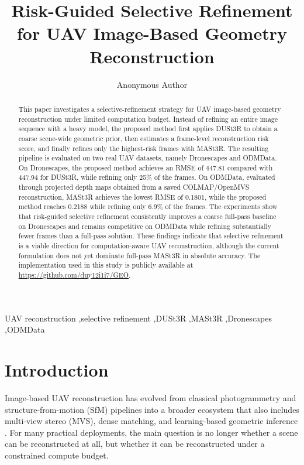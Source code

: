 \documentclass[preprint,12pt]{elsarticle}
\begin{document}
\begin{frontmatter}

\title{Risk-Guided Selective Refinement for UAV Image-Based Geometry Reconstruction}

\author{Anonymous Author}

\begin{abstract}
This paper investigates a selective-refinement strategy for UAV image-based geometry reconstruction under limited computation budget. Instead of refining an entire image sequence with a heavy model, the proposed method first applies DUSt3R to obtain a coarse scene-wide geometric prior, then estimates a frame-level reconstruction risk score, and finally refines only the highest-risk frames with MASt3R. The resulting pipeline is evaluated on two real UAV datasets, namely Dronescapes and ODMData. On Dronescapes, the proposed method achieves an RMSE of 447.81 compared with 447.94 for DUSt3R, while refining only 25\% of the frames. On ODMData, evaluated through projected depth maps obtained from a saved COLMAP/OpenMVS reconstruction, MASt3R achieves the lowest RMSE of 0.1801, while the proposed method reaches 0.2188 while refining only 6.9\% of the frames. The experiments show that risk-guided selective refinement consistently improves a coarse full-pass baseline on Dronescapes and remains competitive on ODMData while refining substantially fewer frames than a full-pass solution. These findings indicate that selective refinement is a viable direction for computation-aware UAV reconstruction, although the current formulation does not yet dominate full-pass MASt3R in absolute accuracy. The implementation used in this study is publicly available at \url{https://github.com/duy12i1i7/GEO}.
\end{abstract}

\begin{keyword}
UAV reconstruction \sep selective refinement \sep DUSt3R \sep MASt3R \sep Dronescapes \sep ODMData
\end{keyword}

\end{frontmatter}

\section{Introduction}

Image-based UAV reconstruction has evolved from classical photogrammetry and structure-from-motion (SfM) pipelines into a broader ecosystem that also includes multi-view stereo (MVS), dense matching, and learning-based geometric inference \citep{Colomina2014Unmanned,Jiang2017Efficient,Jiang2020Efficient,Schonberger2016SfM,Liu2023Deep,Liao2024High}. For many practical deployments, the main question is no longer whether a scene can be reconstructed at all, but whether it can be reconstructed under a constrained compute budget.
\end{document}
